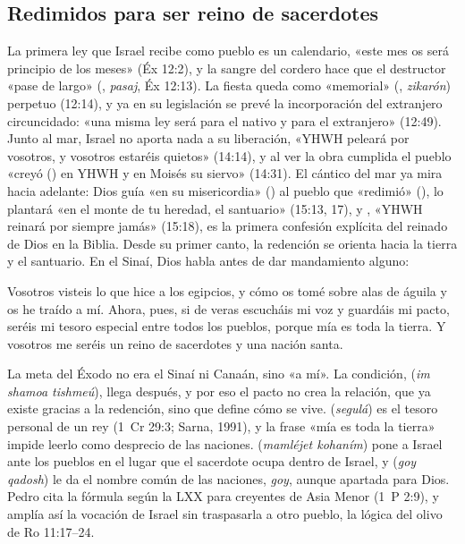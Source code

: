 \subsection{Redimidos para ser reino de sacerdotes}
La primera ley que Israel recibe como pueblo es un calendario, «este mes os será principio de los meses» (Éx 12:2), y la sangre del cordero hace que el destructor «pase de largo» (, \emph{pasaj}, Éx 12:13). La fiesta queda como «memorial» (, \emph{zikarón}) perpetuo (12:14), y ya en su legislación se prevé la incorporación del extranjero circuncidado: «una misma ley será para el nativo y para el extranjero» (12:49). Junto al mar, Israel no aporta nada a su liberación, «YHWH peleará por vosotros, y vosotros estaréis quietos» (14:14), y al ver la obra cumplida el pueblo «creyó () en YHWH y en Moisés su siervo» (14:31). El cántico del mar ya mira hacia adelante: Dios guía «en su misericordia» () al pueblo que «redimió» (), lo plantará «en el monte de tu heredad, el santuario» (15:13, 17), y , «YHWH reinará por siempre jamás» (15:18), es la primera confesión explícita del reinado de Dios en la Biblia. Desde su primer canto, la redención se orienta hacia la tierra y el santuario. En el Sinaí, Dios habla antes de dar mandamiento alguno:

\begin{cita}Vosotros visteis lo que hice a los egipcios, y cómo os tomé sobre alas de águila y os he traído a mí. Ahora, pues, si de veras escucháis mi voz y guardáis mi pacto, seréis mi tesoro especial entre todos los pueblos, porque mía es toda la tierra. Y vosotros me seréis un reino de sacerdotes y una nación santa.\end{cita}

La meta del Éxodo no era el Sinaí ni Canaán, sino «a mí». La condición,  (\emph{im shamoa tishmeú}), llega después, y por eso el pacto no crea la relación, que ya existe gracias a la redención, sino que define cómo se vive.  (\emph{segulá}) es el tesoro personal de un rey (1~Cr 29:3; Sarna, 1991), y la frase «mía es toda la tierra» impide leerlo como desprecio de las naciones.  (\emph{mamléjet kohaním}) pone a Israel ante los pueblos en el lugar que el sacerdote ocupa dentro de Israel, y  (\emph{goy qadosh}) le da el nombre común de las naciones, \emph{goy}, aunque apartada para Dios. Pedro cita la fórmula según la LXX para creyentes de Asia Menor (1~P 2:9), y amplía así la vocación de Israel sin traspasarla a otro pueblo, la lógica del olivo de Ro 11:17–24.

